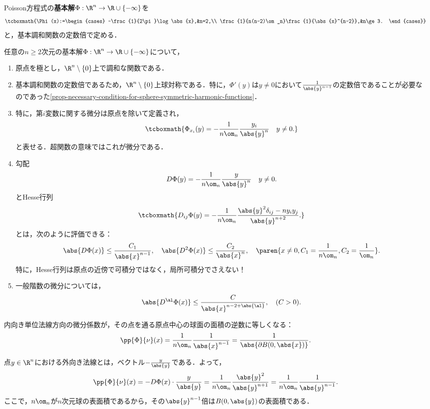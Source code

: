 \documentclass[uplatex,dvipdfmx]{jsreport}
\begin{document}
\begin{definition}
    Poisson方程式の\textbf{基本解}$\Phi:\R^n\to\R\cup\{-\infty\}$を
    \[\tcboxmath{\Phi(x):=\begin{cases}
        -\frac{1}{2\pi}\log\abs{x},&n=2,\\
        \frac{1}{n(n-2)\om_n}\frac{1}{\abs{x}^{n-2}},&n\ge3.
    \end{cases}}\]
    と，基本調和関数の定数倍で定める．
\end{definition}

\begin{proposition}[微分に関する性質]\label{prop-derivative-of-fundamental-solution}
    任意の$n\ge2$次元の基本解$\Phi:\R^n\to\R\cup\{-\infty\}$について，
    \begin{enumerate}
        \item 原点を極とし，$\R^n\setminus\{0\}$上で調和な関数である．
        \item 基本調和関数の定数倍であるため，$\R^n\setminus\{0\}$上球対称である．特に，$\Phi'(y)$は$y\ne0$において$\frac{1}{\abs{y}^{n-1}}$の定数倍であることが必要なのであった\ref{prop-necessary-condition-for-sphere-symmetric-harmonic-functions}．
        \item 特に，第$i$変数に関する微分は原点を除いて定義され，
        \[\tcboxmath{\Phi_{x_i}(y)=-\frac{1}{n\om_n}\frac{y_i}{\abs{y}^n}\quad y\ne0.}\]
        と表せる．超関数の意味ではこれが微分である．
        \item 勾配
        \[D\Phi(y)=-\frac{1}{n\om_n}\frac{y}{\abs{y}^{n}}\quad y\ne0.\]
        とHesse行列
        \[\tcboxmath{D_{ij}\Phi(y)=-\frac{1}{n\om_n}\frac{\abs{y}^2\delta_{ij}-ny_iy_j}{\abs{y}^{n+2}}.}\]
        とは，次のように評価できる：
        \[\abs{D\Phi(x)}\le\frac{C_1}{\abs{x}^{n-1}},\quad\abs{D^2\Phi(x)}\le\frac{C_2}{\abs{x}^n},\quad \paren{x\ne0,C_1=\frac{1}{n\om_n},C_2=\frac{1}{\om_n}}.\]
        特に，Hesse行列は原点の近傍で可積分ではなく，局所可積分でさえない！
        \item 一般階数の微分については，
        \[\abs{D^\al\Phi(x)}\le\frac{C}{\abs{x}^{n-2+\abs{\al}}},\quad(C>0).\]
    \end{enumerate}
\end{proposition}

\begin{corollary}[基本解の係数の設計意図]\label{lemma-design-of-fundamental-solution-of-Poisson-equation}
    内向き単位法線方向の微分係数が，その点を通る原点中心の球面の面積の逆数に等しくなる：
    \[\pp{\Phi}{\nu}(x)=\frac{1}{n\om_n}\frac{1}{\abs{x}^{n-1}}=\frac{1}{\abs{\partial B(0,\abs{x})}}.\]
\end{corollary}
\begin{Proof}
    点$y\in\R^n$における外向き法線とは，ベクトル$-\frac{y}{\abs{y}}$である．よって，
    \[\pp{\Phi}{\nu}(x)=-D\Phi(x)\cdot\frac{y}{\abs{y}}=\frac{1}{n\om_n}\frac{\abs{y}^2}{\abs{y}^{n+1}}=\frac{1}{n\om_n}\frac{1}{\abs{y}^{n-1}}.\]
    ここで，$n\om_n$が$n$次元球の表面積であるから，その$\abs{y}^{n-1}$倍は$B(0,\abs{y})$の表面積である．
\end{Proof}
\end{document}
